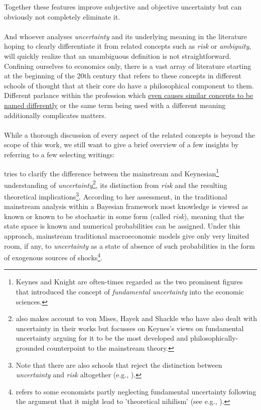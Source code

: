 \documentclass[a4paper,11pt,listof=nochaptergap,oneside,pointednumbers,bibtotoc,bigheadings,liststotoc,hidelinks]{scrbook}
\theoremstyle{mysatz}
\theoremstyle{mydefinition}
\theoremstyle{mytheorem}
\theoremstyle{mybemerkung}
\begin{document}
Together these features improve subjective and objective uncertainty but can obviously not completely eliminate it.\\
\\
And whoever analyses \textit{uncertainty} and its underlying meaning in the literature hoping to clearly differentiate it from related concepts such as \textit{risk} or \textit{ambiguity}, will quickly realize that an unambiguous definition is not straightforward. Confining ourselves to economics only, there is a vast array of literature starting at the beginning of the 20th century that refers to these concepts in different schools of thought that at their core do have a philosophical component to them. Different parlance within the profession which \href{http://www.economics-ejournal.org/economics/discussionpapers/2015-36/file}{even causes similar concepts to be named differently} or the same term being used with a different meaning additionally complicates matters.\\
\\
While a thorough discussion of every aspect of the related concepts is beyond the scope of this work, we still want to give a brief overview of a few insights by referring to a few selecting writings:

\citet{dow:16} tries to clarify the difference between the mainstream and Keynesian\footnote{Keynes and Knight are often-times regarded as the two prominent figures that introduced the concept of \textit{fundamental uncertainty} into the economic sciences.} understanding of \textit{uncertainty}\footnote{\citet{dow:16} also makes account to von Mises, Hayek and Shackle who have also dealt with uncertainty in their works but focusses on Keynes's views on fundamental uncertainty arguing for it to be the most developed and philosophically-grounded counterpoint to the mainstream theory.}, its distinction from \textit{risk} and the resulting theoretical implications\footnote{Note that there are also schools that reject the distinction between \textit{uncertainty} and \textit{risk} altogether (e.g., \citealp{savage:54}).}. According to her assessment, in the traditional mainstream analysis within a Bayesian framework most knowledge is viewed as known or known to be stochastic in some form (called \textit{risk}), meaning that the state space is known and numerical probabilities can be assigned. Under this approach, mainstream traditional macroeconomic models give only very limited room, if any, to \textit{uncertainty} as a state of absence of such probabilities in the form of exogenous sources of shocks\footnote{\citet[p. 43]{dequesh:00} refers to some economists partly neglecting fundamental uncertainty following the argument that it might lead to 'theoretical nihilism' (see e.g., \citealp{coddington:82}).}.
\end{document}
